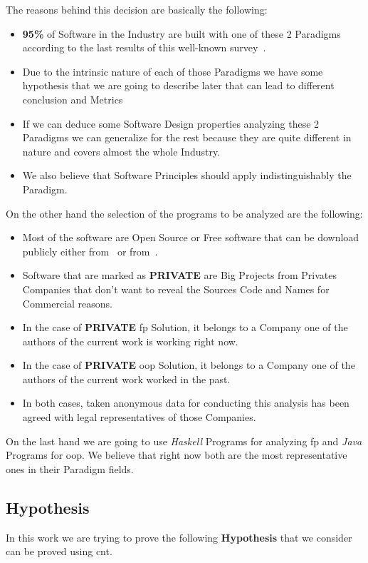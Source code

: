 \documentclass[12pt, a4paper]{article}
\begin{document}
The reasons behind this decision are basically the following:

\begin{itemize}
    \item \textbf{95\%} of Software in the Industry are built with one of these 2 Paradigms according to the last results of this well-known survey~\cite{so_survey}.
    \item Due to the intrinsic nature of each of those Paradigms we have some hypothesis that we are going to describe later that can lead to different conclusion and Metrics
    \item If we can deduce some Software Design properties analyzing these 2 Paradigms we can generalize for the rest because they are quite different in nature and covers almost the whole Industry.
    \item We also believe that Software Principles should apply indistinguishably the Paradigm. 
\end{itemize}

On the other hand the selection of the programs to be analyzed are the following:

\begin{itemize}
    \item Most of the software are Open Source or Free software that can be download publicly either from~\cite{github} or from~\cite{maven_repo}.
    \item Software that are marked as \textbf{PRIVATE} are Big Projects from Privates Companies that don't want to reveal the Sources Code and Names for Commercial reasons.
    \item In the case of \textbf{PRIVATE} \acrshort{fp} Solution, it belongs to a Company one of the authors of the current work is working right now.
    \item In the case of \textbf{PRIVATE} \acrshort{oop} Solution, it belongs to a Company one of the authors of the current work worked in the past.
    \item In both cases, taken anonymous data for conducting this analysis has been agreed with legal representatives of those Companies.
\end{itemize}

On the last hand we are going to use \textit{Haskell} Programs for analyzing \acrlong{fp} and \textit{Java} Programs for \acrlong{oop}. We believe that right now both are the most representative
ones in their Paradigm fields.

\subsection{Hypothesis}
In this work we are trying to prove the following \textbf{Hypothesis} that we consider can be proved using \acrfull{cnt}.
\end{document}

